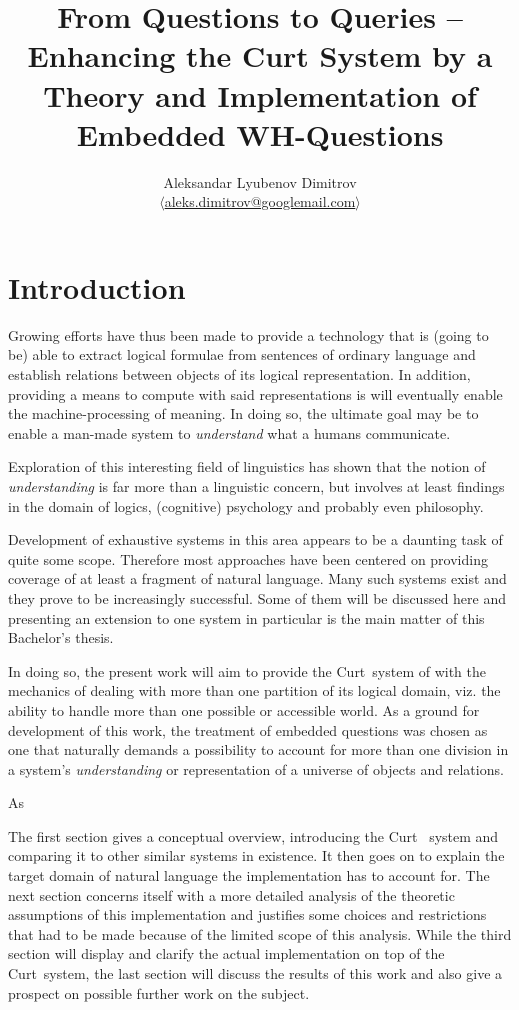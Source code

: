 \documentclass[12pt,a4paper]{article}
\author{Aleksandar Lyubenov Dimitrov\\
$\langle$\href{mailto:aleks.dimitrov@googlemail.com}{aleks.dimitrov@googlemail.com}$\rangle$}
\title{From Questions to Queries – Enhancing the Curt System by a Theory and Implementation of Embedded WH-Questions}
\newcommand{\term}{\textsf} %
\newcommand{\pn}{\textsf} %
\newcommand{\curt}{\pn{Curt}\mbox{ }}
\theoremstyle{remark} \newtheorem*{termin}{Definition} %
\begin{document}
\maketitle
\tableofcontents
\newpage

\section*{Introduction}


Growing efforts have thus been made to provide a technology that is (going to
be) able to extract logical formulae from sentences of ordinary language and
establish relations between objects of its logical representation. In addition,
providing a means to compute with said representations is will eventually enable
the machine-processing of meaning.  In doing so, the ultimate goal may be to
enable a man-made system to \emph{understand} what a humans communicate.

Exploration of this  interesting field of linguistics has shown that
the notion of \emph{understanding} is far more than a linguistic concern, but
involves at least findings in the domain of logics, (cognitive) psychology and
probably even philosophy.

Development of exhaustive systems in this area appears to be a daunting task of
quite some scope. Therefore most approaches have been centered on providing
coverage of at least a fragment of natural language. Many such systems exist and
they prove to be increasingly successful. Some of them will be discussed here
and presenting an extension to one system in particular is the main matter of
this Bachelor's thesis.

In doing so, the present work will aim to provide the \curt system of
\cite{blackburnbos:cl1} with the mechanics of dealing with more than one
partition of its logical domain, viz. the ability to handle more than one
\term{possible} or \term{accessible world}. As a ground for development of this
work, the treatment of \term{embedded questions} was chosen as one that
naturally demands a possibility to account for more than one division in a
system's \emph{understanding} or representation of a universe of objects and
relations. 

As 

The first section gives a conceptual overview, introducing the \curt
system and comparing it to other similar systems in existence. It then goes on
to explain the target domain of natural language the implementation has to
account for.
The next section concerns itself with a more detailed analysis of the theoretic
assumptions of this implementation and justifies some choices and restrictions
that had to be made because of the limited scope of this analysis. While the
third section will display and clarify the actual implementation on top of the
\curt system, the last section will discuss the results of this work and also
give a prospect on possible further work on the subject.
\end{document}
